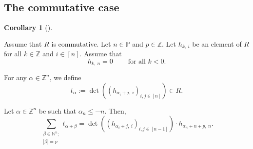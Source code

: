 \documentclass[numbers=enddot,12pt,final,onecolumn,notitlepage,english]{scrartcl}%
\theoremstyle{definition}
\newtheorem{coro}[theo]{Corollary}
\newenvironment{corollary}[1][]
{\begin{coro}[#1]\begin{leftbar}}
{\end{leftbar}\end{coro}}
\let\sumnonlimits\sum
\renewcommand{\sum}{\sumnonlimits\limits}
\begin{document}
\subsection{The commutative case}

\begin{corollary}
\label{cor.pre-pieri.2comm}Assume that $R$ is commutative. Let $n\in
\mathbb{P}$ and $p\in\mathbb{Z}$. Let $h_{k,\ i}$ be an element of $R$ for all
$k\in\mathbb{Z}$ and $i\in\left[  n\right]  $. Assume that%
\[
h_{k,\ n}=0\ \ \ \ \ \ \ \ \ \ \text{for all }k<0.
\]


For any $\alpha\in\mathbb{Z}^{n}$, we define%
\[
t_{\alpha}:=\det\left(  \left(  h_{\alpha_{i}+j,\ i}\right)  _{i,j\in\left[
n\right]  }\right)  \in R.
\]


Let $\alpha\in\mathbb{Z}^{n}$ be such that $\alpha_{n}\leq-n$. Then,%
\[
\sum_{\substack{\beta\in\mathbb{N}^{n};\\\left\vert \beta\right\vert
=p}}t_{\alpha+\beta}=\det\left(  \left(  h_{\alpha_{i}+j,\ i}\right)
_{i,j\in\left[  n-1\right]  }\right)  \cdot h_{\alpha_{n}+n+p,\ n}.
\]

\end{corollary}
\end{document}
